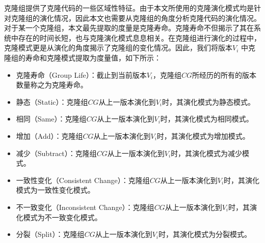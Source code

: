 克隆组提供了克隆代码的一些区域性特征。由于本文所使用的克隆演化模式均是针对克隆组的演化情况，因此本文也需要从克隆组的角度分析克隆代码的演化情况。
对于某一个克隆组，本文最先提取的度量是克隆寿命。克隆寿命不但揭示了其在系统中存在的时间长短，也与克隆演化模式息息相关。在克隆组进行演化的过程中，克隆模式更是从演化的角度揭示了克隆组的变化情况。因此，我们将版本$V_i $ 中克隆组的寿命和克隆模式提取为度量值，如下所示：
\begin{itemize}
\item
克隆寿命（Group Life）：截止到当前版本$V_ i $，克隆组$CG$所经历的所有的版本数量称之为克隆寿命。
\item
静态（Static）：克隆组$CG$从上一版本演化到$V_ i $时，其演化模式为静态模式。
\item
相同（Same）：克隆组$CG$从上一版本演化到$V_ i $时，其演化模式为相同模式。
\item
增加（Add）：克隆组$CG$从上一版本演化到$V_ i $时，其演化模式为增加模式。
\item
减少（Subtract）：克隆组$CG$从上一版本演化到$V_ i $时，其演化模式为减少模式。
\item
一致性变化（Consistent Change）：克隆组$CG$从上一版本演化到$V_ i $时，其演化模式为一致性变化模式。
\item
不一致变化（Inconsistent Change）：克隆组$CG$从上一版本演化到$V_ i $时，其演化模式为不一致变化模式。
\item
分裂（Split）：克隆组$CG$从上一版本演化到$V_ i $时，其演化模式为分裂模式。
\end{itemize}

